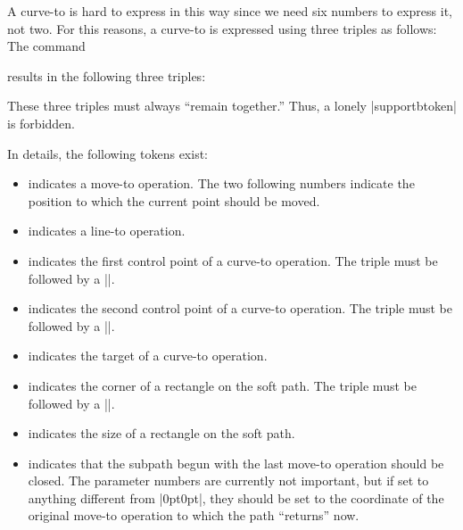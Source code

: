 A curve-to is hard to express in this way since we need six numbers to
express it, not two. For this reasons, a curve-to is expressed using
three triples as follows: The command
\begin{codeexample}
\pgfsyssoftpath@curveto{1bp}{2bp}{3bp}{4bp}{5bp}{6bp}
\end{codeexample}
\noindent
results in the following three triples:
\begin{codeexample}
\pgfsyssoftpath@curvetosupportatoken{1bp}{2bp}
\pgfsyssoftpath@curvetosupportbtoken{3bp}{4bp}
\pgfsyssoftpath@curvetotoken{5bp}{6bp}
\end{codeexample}

These three triples must always ``remain together.'' Thus, a lonely
|supportbtoken| is forbidden.

In details, the following tokens exist:
\begin{itemize}
\item
  \declare{|\pgfsyssoftpath@movetotoken|} indicates a move-to
  operation. The two following numbers indicate the position to which
  the current point should be moved.
\item
  \declare{|\pgfsyssoftpath@linetotoken|} indicates a line-to
  operation. 
\item
  \declare{|\pgfsyssoftpath@curvetosupportatoken|} indicates the first
  control point of a curve-to operation. The triple must be followed
  by a |\pgfsyssoftpath@curvetosupportbtoken|.
\item
  \declare{|\pgfsyssoftpath@curvetosupportbtoken|} indicates the second
  control point of a curve-to operation. The triple must be followed
  by a |\pgfsyssoftpath@curvetotoken|.
\item
  \declare{|\pgfsyssoftpath@curvetotoken|} indicates the target
  of a curve-to operation.
\item
  \declare{|\pgfsyssoftpath@rectcornertoken|} indicates the corner of
  a rectangle on the soft path. The triple must be followed
  by a |\pgfsyssoftpath@rectsizetoken|.
\item
  \declare{|\pgfsyssoftpath@rectsizetoken|} indicates the size of
  a rectangle on the soft path.
\item
  \declare{|\pgfsyssoftpath@closepath|} indicates that the subpath
  begun with the last move-to operation should be closed. The parameter
  numbers are currently not important, but if set to anything
  different from |{0pt}{0pt}|, they should be set to the coordinate of
  the original move-to operation to which the path ``returns'' now.
\end{itemize}




